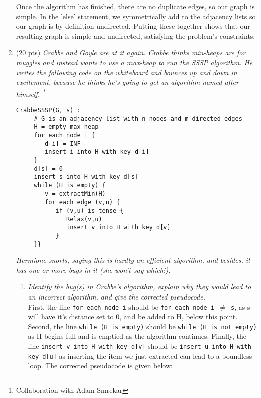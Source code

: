 \documentclass[12pt]{article}
\begin{document}
\begin{enumerate}
	Once the algorithm has finished, there are no duplicate edges, so our graph is simple. In the 'else' statement, we symmetrically add to the adjacency 
lists so our graph is by definition undirected. Putting these together shows that our resulting graph is simple and undirected, satisfying the problem's 
constraints.

    \newpage
	\item (20 pts) \textit{Crabbe and Goyle are at it again. Crabbe thinks min-heaps are for muggles and instead wants to use a max-heap to run the SSSP 
algorithm. He writes the following code on the whiteboard and bounces up and down in excitement, because he thinks he's going to get an algorithm named after 
himself. \footnote{Collaboration with Adam Smrekar}}
\begin{small}
\begin{verbatim}
CrabbeSSSP(G, s) :
     # G is an adjacency list with n nodes and m directed edges
     H = empty max-heap
     for each node i {
        d[i] = INF
        insert i into H with key d[i]
     }
     d[s] = 0
     insert s into H with key d[s]
     while (H is empty) {
        v = extractMin(H)
        for each edge (v,u) {
           if (v,u) is tense {
              Relax(v,u)
              insert v into H with key d[v]
           }
     }}
\end{verbatim}
\end{small}

\textit{Hermione snorts, saying this is hardly an \textit{efficient} algorithm, and besides, it has one or more bugs in it (she won't say which!).}
	
	\begin{enumerate}
	\item \textit{Identify the bug(s) in Crabbe's algorithm, explain why they would lead to an incorrect algorithm, and give the corrected pseudocode.}\\
	
    First, the line {\tt for each node i} should be {\tt for each node i $\neq$ s}, as s will have it's distance set to 0, and be added to H, below this 
point. Second, the line {\tt while (H is empty)} should be {\tt while (H is not empty)} as H begins full and is emptied as the algorithm continues. Finally, 
the line {\tt insert v into H with key d[v]} should be {\tt insert u into H with key d[u]} as inserting the item we just extracted can lead to a boundless 
loop. The corrected pseudocode is given below:\\


\end{enumerate}
\end{enumerate}
\end{document}
